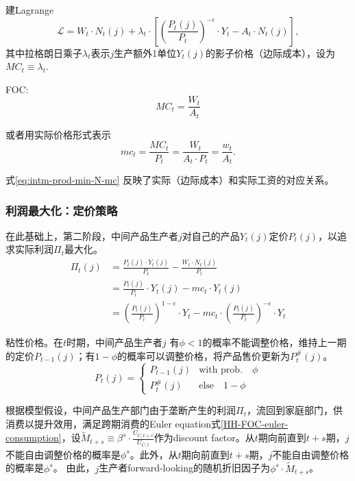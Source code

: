 建Lagrange
\begin{equation*}
  \mathcal{L} = W_t \cdot N_t(j) + \lambda_t \cdot \left[
\left(\frac{P_t(j)}{P_t}\right)^{-\epsilon} \cdot Y_t - A_t \cdot N_t(j)
\right],
\end{equation*}
其中拉格朗日乘子$\lambda_t$表示$j$生产额外1单位$Y_t(j)$的影子价格（边际成本），设为$MC_t \equiv \lambda_t $.

FOC:
\begin{equation*}
  MC_t = \frac{W_t}{A_t}
\end{equation*}

或者用实际价格形式表示
\begin{equation}
  \label{eq:intm-prod-min-N-mc}
    mc_t = \frac{MC_t}{P_t} = \frac{W_t}{A_t \cdot P_t} = \frac{w_t}{A_t}.
\end{equation}

式\eqref{eq:intm-prod-min-N-mc}  反映了实际（边际成本）和实际工资的对应关系。

\subsubsection{利润最大化：定价策略}
\label{sec:intm-max-profit}
在此基础上，第二阶段，中间产品生产者$j$对自己的产品$Y_t(j)$定价$P_t(j)$，以追求实际利润$\Pi_t$最大化。
\begin{equation}
  \label{eq:intm-prod-profit}
  \begin{split}
    \Pi_t(j) &= \frac{P_t(j) \cdot Y_t(j)}{P_t} - \frac{W_t \cdot N_t(j)}{P_t} \\
    &=\frac{P_t(j)}{P_t} \cdot Y_t(j) - mc_t \cdot Y_t(j) \\
    &=\left( \frac{P_t(j)}{P_t}\right)^{1-\epsilon} \cdot Y_t - mc_t \cdot \left( \frac{P_t(j)}{P_t}\right)^{-\epsilon} \cdot Y_t
  \end{split}
\end{equation}

粘性价格。在$t$时期，中间产品生产者$j$ 有$\phi<1$的概率不能调整价格，维持上一期的定价$P_{t-1}(j)$；有$1-\phi$的概率可以调整价格，将产品售价更新为$P_t^{\#}(j)$。
\begin{equation}
  \label{eq:intm-stick-prices}
  P_t(j) =
  \begin{cases} P_{t-1}(j) &\mbox{with prob.} \quad \phi \\
    P_t^{\#}(j) & \mbox{else} \quad 1-\phi
\end{cases}
\end{equation}

根据模型假设，中间产品生产部门由于垄断产生的利润$\Pi_t$，流回到家庭部门，供消费以提升效用，满足跨期消费的Euler equation式\eqref{HH-FOC-euler-consumption}，设$\widetilde{M}_{t+s} \equiv \beta^s \cdot \frac{U_{C,t+s}}{U_{C,t}}$作为discount factor。从$t$期向前直到$t+s$期，$j$不能自由调整价格的概率是$\phi^s$。此外，从$t$期向前直到$t+s$期，$j$不能自由调整价格的概率是$\phi^s$。
由此，$j$生产者forward-looking的随机折旧因子为$\phi^s \cdot \widetilde{M}_{t+s}$。

